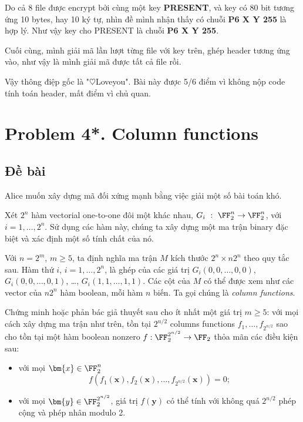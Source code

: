 Do cả 8 file được encrypt bởi cùng một key \textbf{PRESENT}, và key có 80 bit tương ứng 10 bytes, hay 10 ký tự, nhìn đề mình nhận thấy có chuỗi \textbf{P6 X Y 255} là hợp lý. Như vậy key cho PRESENT là chuỗi \textbf{P6 X Y 255}.

Cuối cùng, mình giải mã lần lượt từng file với key trên, ghép header tương ứng vào, như vậy là mình giải mã được tất cả file rồi.

Vậy thông điệp gốc là "$\heartsuit$Loveyou". Bài này được 5/6 điểm vì không nộp code tính toán header, mất điểm vì chủ quan.

\section*{Problem 4*. Column functions}

\subsection*{Đề bài}

Alice muốn xây dựng mã đối xứng mạnh bằng việc giải một số bài toán khó.

Xét $2^n$ hàm vectorial one-to-one đôi một khác nhau, $G_i \ : \ \FF_2^n \to \FF_2^n$, với $i = 1, \ldots, 2^n$. Sử dụng các hàm này, chúng ta xây dựng một ma trận binary đặc biệt và xác định một số tính chất của nó.

Với $n=2^m$, $m \geqslant 5$, ta định nghĩa ma trận $M$ kích thước $2^n \times n 2^n$ theo quy tắc sau. Hàm thứ $i$, $i = 1, \ldots, 2^n$, là ghép của các giá trị $G_i(0, 0, \ldots, 0, 0)$, $G_i(0, 0, \ldots, 0, 1)$, \dots, $G_i(1, 1, \ldots, 1, 1)$. Các cột của $M$ có thể được xem như các vector của $n 2^n$ hàm boolean, mỗi hàm $n$ biến. Ta gọi chúng là \textit{column functions}.

Chứng minh hoặc phản bác giả thuyết sau cho ít nhất một giá trị $m \geqslant 5$: với mọi cách xây dựng ma trận như trên, tồn tại $2^{n/2}$ columns functions $f_1, \ldots, f_{2^{n/2}}$ sao cho tồn tại một hàm boolean nonzero $f: \FF_2^{2^{n/2}} \to \FF_2$ thỏa mãn các điều kiện sau:

\begin{itemize}
    \item với mọi $\bm{x} \in \FF_2^n$
    \begin{equation*}
        f(f_1(\bm{x}), f_2(\bm{x}), \ldots, f_{2^{n/2}}(\bm{x})) = 0;
    \end{equation*}
    \item với mọi $\bm{y} \in \FF_2^{2^{n/2}}$, giá trị $f(\bm{y})$ có thể tính với không quá $2^{n/2}$ phép cộng và phép nhân modulo 2.
\end{itemize}


